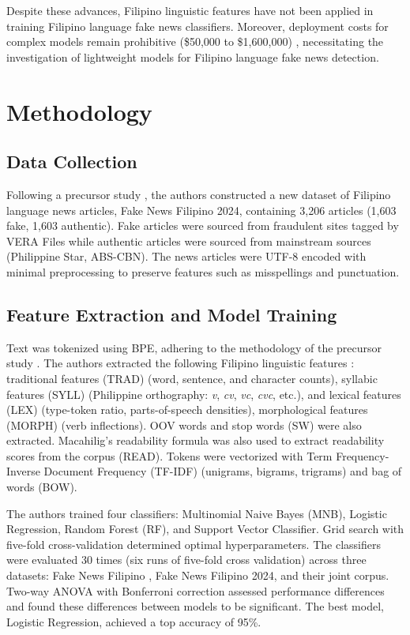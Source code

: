 \documentclass[conference]{IEEEtran}
\begin{document}
Despite these advances, Filipino linguistic features have not been applied in training Filipino language fake news classifiers. Moreover, deployment costs for complex models remain prohibitive (\$50,000 to \$1,600,000) \cite{b4}, necessitating the investigation of lightweight models for Filipino language fake news detection.

\section{Methodology}

\subsection{Data Collection}
Following a precursor study \cite{b3}, the authors constructed a new dataset of Filipino language news articles, Fake News Filipino 2024, containing 3,206 articles (1,603 fake, 1,603 authentic). Fake articles were sourced from fraudulent sites tagged by VERA Files while authentic articles were sourced from mainstream sources (Philippine Star, ABS-CBN). The news articles were UTF-8 encoded with minimal preprocessing to preserve features such as misspellings and punctuation.

\subsection{Feature Extraction and Model Training}
Text was tokenized using BPE, adhering to the methodology of the precursor study \cite{b3}. The authors extracted the following Filipino linguistic features \cite{b8,b9,b10}: traditional features (TRAD) (word, sentence, and character counts), syllabic features (SYLL) (Philippine orthography: \textit{v}, \textit{cv}, \textit{vc}, \textit{cvc}, etc.), and lexical features (LEX) (type-token ratio, parts-of-speech densities), morphological features (MORPH) (verb inflections). OOV words and stop words (SW) were also extracted. Macahilig's readability formula \cite{b10} was also used to extract readability scores from the corpus (READ). Tokens were vectorized with Term Frequency-Inverse Document Frequency (TF-IDF) (unigrams, bigrams, trigrams) and bag of words (BOW).

The authors trained four classifiers: Multinomial Naive Bayes (MNB), Logistic Regression, Random Forest (RF), and Support Vector Classifier. Grid search with five-fold cross-validation determined optimal hyperparameters. The classifiers were evaluated 30 times (six runs of five-fold cross validation) across three datasets: Fake News Filipino \cite{b3}, Fake News Filipino 2024, and their joint corpus. Two-way ANOVA with Bonferroni correction assessed performance differences and found these differences between models to be significant. The best model, Logistic Regression, achieved a top accuracy of 95\%.
\end{document}
